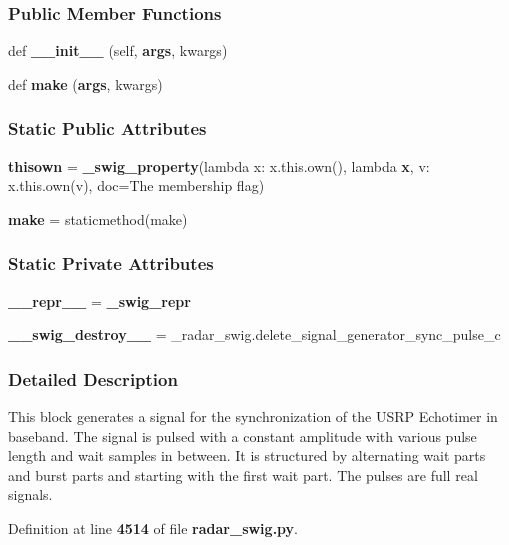 \subsubsection*{Public Member Functions}
\begin{DoxyCompactItemize}
\item 
def {\bf \+\_\+\+\_\+init\+\_\+\+\_\+} (self, {\bf args}, kwargs)
\item 
def {\bf make} ({\bf args}, kwargs)
\end{DoxyCompactItemize}
\subsubsection*{Static Public Attributes}
\begin{DoxyCompactItemize}
\item 
{\bf thisown} = {\bf \+\_\+swig\+\_\+property}(lambda x\+: x.\+this.\+own(), lambda {\bf x}, v\+: x.\+this.\+own(v), doc=\textquotesingle{}The membership flag\textquotesingle{})
\item 
{\bf make} = staticmethod(make)
\end{DoxyCompactItemize}
\subsubsection*{Static Private Attributes}
\begin{DoxyCompactItemize}
\item 
{\bf \+\_\+\+\_\+repr\+\_\+\+\_\+} = {\bf \+\_\+swig\+\_\+repr}
\item 
{\bf \+\_\+\+\_\+swig\+\_\+destroy\+\_\+\+\_\+} = \+\_\+radar\+\_\+swig.\+delete\+\_\+signal\+\_\+generator\+\_\+sync\+\_\+pulse\+\_\+c
\end{DoxyCompactItemize}


\subsubsection{Detailed Description}
\begin{DoxyVerb}This block generates a signal for the synchronization of the USRP Echotimer in baseband. The signal is pulsed with a constant amplitude with various pulse length and wait samples in between. It is structured by alternating wait parts and burst parts and starting with the first wait part. The pulses are full real signals.\end{DoxyVerb}
 

Definition at line {\bf 4514} of file {\bf radar\+\_\+swig.\+py}.



